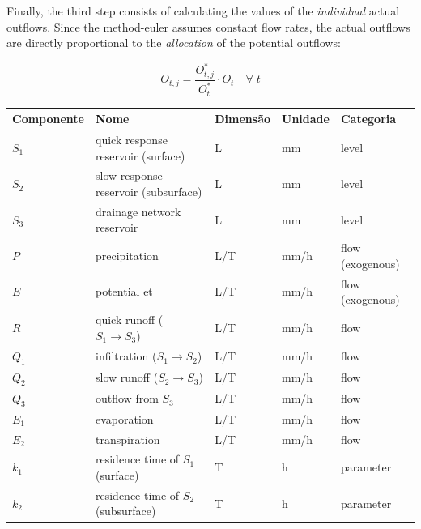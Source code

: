 \documentclass[./main_en.tex]{subfiles}
\begin{document}
Finally, the third step consists of calculating the values of the \textit{individual} actual outflows. Since the \gls{method-euler} assumes constant flow rates, the actual outflows are directly proportional to the \textit{allocation} of the potential outflows:
\begin{linenomath*}
\begin{equation} 
	\label{eq:simult_3}
 O_{t, j} = \frac{O^*_{t, j}}{O^*_t} \cdot O_{t} \quad \forall\;t
\end{equation}
\end{linenomath*}

{\renewcommand{\arraystretch}{1.5}%
\begin{table}[t!]
    \centering	
    \tiny
    \sffamily
    \begin{tabular}{ 
        >{\raggedright\arraybackslash}m{1cm}  
        >{\raggedright\arraybackslash}m{6cm}  
        >{\raggedright\arraybackslash}m{1cm}
        >{\raggedright\arraybackslash}m{1cm}
        >{\raggedright\arraybackslash}m{2cm}}
        \toprule
        \textbf{Componente} & \textbf{Nome} & \textbf{Dimensão} & \textbf{Unidade} & \textbf{Categoria} \\ 
        \midrule
        $S_1$ & quick response reservoir (surface) & L & mm & level \\ 
        $S_2$ & slow response reservoir (subsurface) & L & mm & level \\ 
        $S_3$ & drainage network reservoir & L & mm & level \\ 
        $P$ & precipitation & L/T & mm/h & flow (exogenous)\\
        $E$ & potential \acrlong{et} & L/T & mm/h & flow (exogenous)\\ 
        $R$ & quick runoff ($S_1 \rightarrow S_3$) & L/T & mm/h & flow\\ 
        $Q_1$ & infiltration ($S_1 \rightarrow S_2$) & L/T & mm/h & flow\\ 
        $Q_2$ & slow runoff ($S_2 \rightarrow S_3$) & L/T & mm/h & flow\\ 
        $Q_3$ & outflow from $S_3$ & L/T & mm/h & flow\\ 
        $E_1$ & evaporation & L/T & mm/h & flow\\ 
        $E_2$ & transpiration & L/T & mm/h & flow\\ 
        $k_1$ & residence time of $S_1$ (surface) & T & h & parameter \\ 
        $k_2$ & residence time of $S_2$ (subsurface) & T & h & parameter \\ 

\end{tabular}
\end{table}}
\end{document}
